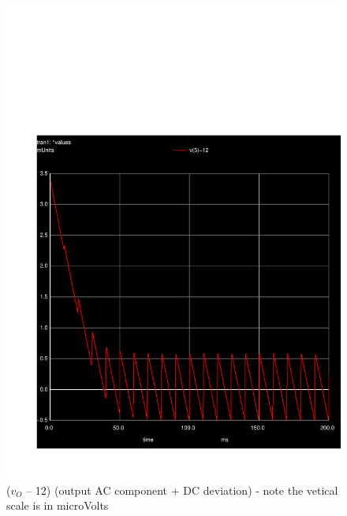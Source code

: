 \par
\begin{figure}[H] \centering
\includegraphics[width=0.6\linewidth]{vo_menos_12.pdf}
\caption{($v_O$ – 12) (output AC component + DC deviation) - note the vetical scale is in microVolts}
\label{fig:deviation}
\end{figure}

\pagebreak
